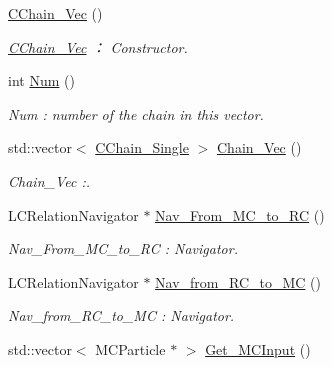 \begin{DoxyCompactItemize}
\item 
\hypertarget{classToolSet_1_1CChain__Vec_aacdadd594aff8dcf8e5f7634aec76c7d}{
\hyperlink{classToolSet_1_1CChain__Vec_aacdadd594aff8dcf8e5f7634aec76c7d}{CChain\_\-Vec} ()}
\label{classToolSet_1_1CChain__Vec_aacdadd594aff8dcf8e5f7634aec76c7d}

\begin{DoxyCompactList}\small\item\em \hyperlink{classToolSet_1_1CChain__Vec}{CChain\_\-Vec} ： Constructor. \item\end{DoxyCompactList}\item 
int \hyperlink{classToolSet_1_1CChain__Vec_ad1ba5109d2db818706de4e96f485f72c}{Num} ()
\begin{DoxyCompactList}\small\item\em Num : number of the chain in this vector. \item\end{DoxyCompactList}\item 
std::vector$<$ \hyperlink{classToolSet_1_1CChain__Single}{CChain\_\-Single} $>$ \hyperlink{classToolSet_1_1CChain__Vec_ace17e3ec32dca382602d0ccc9f2d377e}{Chain\_\-Vec} ()
\begin{DoxyCompactList}\small\item\em Chain\_\-Vec :. \item\end{DoxyCompactList}\item 
LCRelationNavigator $\ast$ \hyperlink{classToolSet_1_1CChain__Vec_aee6526eb88b188ad12a664b1cf50df45}{Nav\_\-From\_\-MC\_\-to\_\-RC} ()
\begin{DoxyCompactList}\small\item\em Nav\_\-From\_\-MC\_\-to\_\-RC : Navigator. \item\end{DoxyCompactList}\item 
LCRelationNavigator $\ast$ \hyperlink{classToolSet_1_1CChain__Vec_a37f706763eba430e02efe9ce3965ed8c}{Nav\_\-from\_\-RC\_\-to\_\-MC} ()
\begin{DoxyCompactList}\small\item\em Nav\_\-from\_\-RC\_\-to\_\-MC : Navigator. \item\end{DoxyCompactList}\item 
std::vector$<$ MCParticle $\ast$ $>$ \hyperlink{classToolSet_1_1CChain__Vec_aa9f1bcca5d3f17ae1319e96eb9fdd7c1}{Get\_\-MCInput} ()

\end{DoxyCompactItemize}
